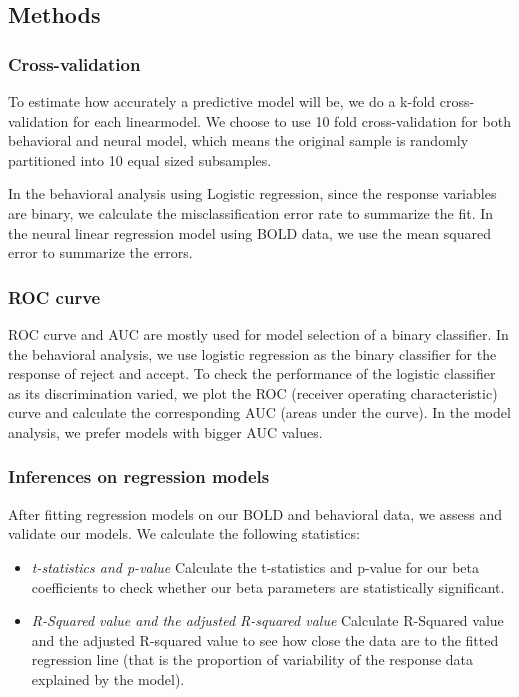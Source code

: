 \documentclass[11pt]{article}
\begin{document}
\subsection{Methods}

\subsubsection{Cross-validation}

To estimate how accurately a predictive model will be, we do a k-fold 
cross-validation for each linearmodel. We choose to use 10 fold 
cross-validation for both behavioral and neural model,
which means the original sample is randomly partitioned into 10 equal sized 
subsamples. 
\par
In the behavioral analysis using Logistic regression, since the response 
variables are binary, we calculate the misclassification error rate to 
summarize the fit. In the neural linear regression model using BOLD data, we 
use the mean squared error to summarize the errors.

\subsubsection{ROC curve}

ROC curve and AUC are mostly used for model selection of a binary classifier. 
In the behavioral analysis, we use logistic regression as the binary 
classifier for the response of reject and accept. To check the performance of 
the logistic classifier as its discrimination varied, we plot the ROC 
(receiver operating characteristic) curve and calculate the corresponding AUC 
(areas under the curve). In the model analysis, we prefer models with bigger 
AUC values.

\subsubsection{Inferences on regression models}

After fitting regression models on our BOLD and behavioral data, we assess 
and validate our models. We calculate the following statistics:
\begin{itemize}
\item \emph{t-statistics and p-value} Calculate the t-statistics and p-value for 
our beta coefficients to check whether our beta parameters are statistically 
significant.
\item \emph{R-Squared value and the adjusted R-squared value} Calculate 
R-Squared value and the adjusted R-squared value to see how close the data are 
to the fitted regression line (that is the proportion of variability of the 
response data explained by the model).
\end{itemize}
\end{document}
